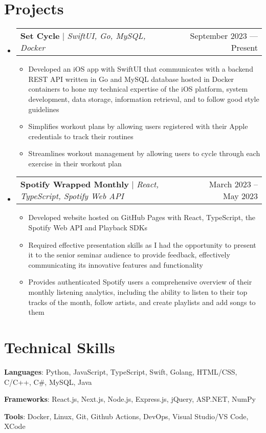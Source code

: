 \documentclass[letterpaper,11pt]{article}
\makeatletter
\newcommand{\resumeItem}[1]{
  \item\small{
	{#1 \vspace{-2pt}}
  }
}
\newcommand{\resumeProjectHeading}[2]{
	\item
	\begin{tabular*}{0.97\textwidth}{l@{\extracolsep{\fill}}r}
	  \small#1 & #2 \\
	\end{tabular*}\vspace{-7pt}
}
\newcommand{\resumeSubHeadingListStart}{\begin{itemize}[leftmargin=0.15in, label={}]}
\newcommand{\resumeSubHeadingListEnd}{\end{itemize}}
\newcommand{\resumeItemListStart}{\begin{itemize}}
\newcommand{\resumeItemListEnd}{\end{itemize}\vspace{-5pt}}
\makeatother
\begin{document}
\section{Projects}
\resumeSubHeadingListStart
\resumeProjectHeading
	{\textbf{Set Cycle} $|$ \emph{SwiftUI, Go, MySQL, Docker}}{September 2023 --- Present}
	\resumeItemListStart
		\resumeItem{Developed an iOS app with SwiftUI that communicates with a backend REST API written in Go and MySQL database hosted in Docker containers to hone my technical expertise of the iOS platform, system development, data storage, information retrieval, and to follow good style guidelines}
		\resumeItem{Simplifies workout plans by allowing users registered with their Apple credentials to track their routines}
		\resumeItem{Streamlines workout management by allowing users to cycle through each exercise in their workout plan}
	\resumeItemListEnd
\resumeProjectHeading
	{\textbf{Spotify Wrapped Monthly} $|$ \emph{React, TypeScript, Spotify Web API}}{March 2023 -- May 2023 }
	\resumeItemListStart
		\resumeItem{Developed website hosted on GitHub Pages with React, TypeScript, the Spotify Web API and Playback SDKs}
		\resumeItem{Required effective presentation skills as I had the opportunity to present it to the senior seminar audience to provide feedback, effectively communicating its innovative features and functionality}
		\resumeItem{Provides authenticated Spotify users a comprehensive overview of their monthly listening analytics, including the ability to listen to their top tracks of the month, follow artists, and create playlists and add songs to them}
	\resumeItemListEnd
\resumeSubHeadingListEnd

\section{Technical Skills}
 \begin{itemize}[leftmargin=0.15in, label={}]
	\small{
	  \item{\textbf{Languages}: Python, JavaScript, TypeScript, Swift, Golang, HTML/CSS, C/C++, C\#, MySQL, Java}
	  \item{\textbf{Frameworks}: React.js, Next.js, Node.js, Express.js, jQuery, ASP.NET, NumPy}
	  \item{\textbf{Tools}: Docker, Linux, Git, Github Actions, DevOps, Visual Studio/VS Code, XCode}
	  }
 \end{itemize}

\end{document}
